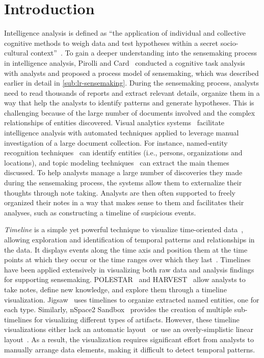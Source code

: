 \section{Introduction}
Intelligence analysis is defined as ``the application of individual and collective cognitive methods to weigh data and test hypotheses within a secret socio-cultural context''~\cite{Johnston2005}. To gain a deeper understanding into the sensemaking process in intelligence analysis, Pirolli and Card~\cite{Pirolli2005} conducted a cognitive task analysis with analysts and proposed a process model of sensemaking, which was described earlier in detail in \autoref{sub:lr-sensemaking}. During the sensemaking process, analysts need to read thousands of reports and extract relevant details, organize them in a way that help the analysts to identify patterns and generate hypotheses. This is challenging because of the large number of documents involved and the complex relationships of entities discovered. Visual analytics systems~\cite{Pioch2006,Wright2006,Stasko2007} facilitate intelligence analysis with automated techniques applied to leverage manual investigation of a large document collection. For instance, named-entity recognition techniques~\cite{Nadeau2007} can identify entities (i.e., persons, organizations and locations), and topic modeling techniques~\cite{Blei2003} can extract the main themes discussed. To help analysts manage a large number of discoveries they made during the sensemaking process, the systems allow them to externalize their thoughts through note taking. Analysts are then often supported to freely organized their notes in a way that makes sense to them and facilitates their analyses, such as constructing a timeline of suspicious events.

\emph{Timeline} is a simple yet powerful technique to visualize time-oriented data~\cite{Tufte1983}, allowing exploration and identification of temporal patterns and relationships in the data. It displays events along the time axis and position them at the time points at which they occur or the time ranges over which they last~\cite{Plaisant1996}. Timelines have been applied extensively in visualizing both raw data and analysis findings for supporting sensemaking. POLESTAR~\cite{Pioch2006} and HARVEST~\cite{Gotz2006} allow analysts to take notes, define new knowledge, and explore them through a timeline visualization. Jigsaw~\cite{Gorg2013} uses timelines to organize extracted named entities, one for each type. Similarly, nSpace2 Sandbox~\cite{SandboxTimeline2012} provides the creation of multiple sub-timelines for visualizing different types of artifacts. However, these timeline visualizations either lack an automatic layout~\cite{Pioch2006} or use an overly-simplistic linear layout~\cite{SandboxTimeline2012}. As a result, the visualization requires significant effort from analysts to manually arrange data elements, making it difficult to detect temporal patterns.

